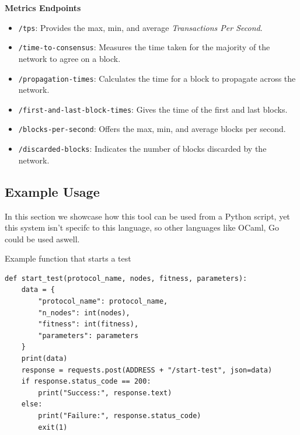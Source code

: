 \textbf{Metrics Endpoints}
\begin{itemize}
  \item \texttt{/tps}: Provides the max, min, and average \textit{Transactions Per Second}.
  \item \texttt{/time-to-consensus}: Measures the time taken for the majority of the network to agree on a block.
  \item \texttt{/propagation-times}: Calculates the time for a block to propagate across the network.
  \item \texttt{/first-and-last-block-times}: Gives the time of the first and last blocks.
  \item \texttt{/blocks-per-second}: Offers the max, min, and average blocks per second.
  \item \texttt{/discarded-blocks}: Indicates the number of blocks discarded by the network.
\end{itemize}


\subsection*{Example Usage}

In this section we showcase how this tool can be used from a Python script, yet this system isn't specifc to this language, so other languages like OCaml, Go could be used aswell.

\begin{listing}[H]
\caption{Example function that starts a test}
\label{lst:python_code}
\begin{verbatim}
def start_test(protocol_name, nodes, fitness, parameters):
    data = {
        "protocol_name": protocol_name,
        "n_nodes": int(nodes),
        "fitness": int(fitness),
        "parameters": parameters
    }
    print(data)
    response = requests.post(ADDRESS + "/start-test", json=data)
    if response.status_code == 200:
        print("Success:", response.text)
    else:
        print("Failure:", response.status_code)
        exit(1)
\end{verbatim}
\end{listing}

